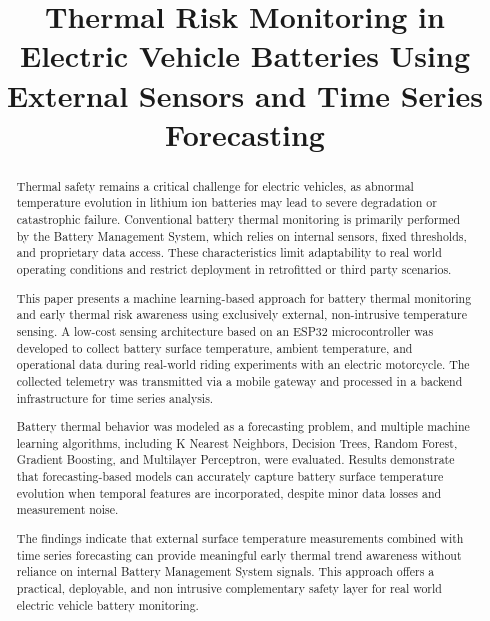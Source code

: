 \documentclass[conference]{IEEEtran}
\begin{document}
\title{Thermal Risk Monitoring in Electric Vehicle Batteries Using External Sensors and Time Series Forecasting}

\author{
}

\maketitle

\begin{abstract}
Thermal safety remains a critical challenge for electric vehicles, as abnormal temperature evolution in lithium ion batteries may lead to severe degradation or catastrophic failure. Conventional battery thermal monitoring is primarily performed by the Battery Management System, which relies on internal sensors, fixed thresholds, and proprietary data access. These characteristics limit adaptability to real world operating conditions and restrict deployment in retrofitted or third party scenarios.

This paper presents a machine learning-based approach for battery thermal monitoring and early thermal risk awareness using exclusively external, non-intrusive temperature sensing. A low-cost sensing architecture based on an ESP32 microcontroller was developed to collect battery surface temperature, ambient temperature, and operational data during real-world riding experiments with an electric motorcycle. The collected telemetry was transmitted via a mobile gateway and processed in a backend infrastructure for time series analysis.

Battery thermal behavior was modeled as a forecasting problem, and multiple machine learning algorithms, including K Nearest Neighbors, Decision Trees, Random Forest, Gradient Boosting, and Multilayer Perceptron, were evaluated. Results demonstrate that forecasting-based models can accurately capture battery surface temperature evolution when temporal features are incorporated, despite minor data losses and measurement noise.

The findings indicate that external surface temperature measurements combined with time series forecasting can provide meaningful early thermal trend awareness without reliance on internal Battery Management System signals. This approach offers a practical, deployable, and non intrusive complementary safety layer for real world electric vehicle battery monitoring.
\end{abstract}
\end{document}
